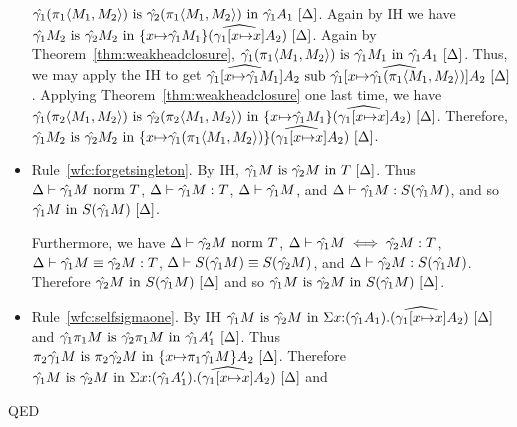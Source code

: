 \documentclass{article}
\theoremstyle{break}
\newcommand{\qed}{\mbox{QED}}
\newenvironment{proof}{\noindent{\bf Proof:}\hspace*{0.5em}}{\hspace*{\fill}\qed}
\begin{document}
\begin{proof}
\begin{itemize}
${\hat{\gamma_1}({\pi_{1}}{\langle{M_1},{M_2}\rangle})}\mathrm{\ is\ }{\hat{\gamma_2}({\pi_{1}}{\langle{M_1},{M_2}\rangle})}\mathrm{\ in\ }{\hat{\gamma_1}A_1}\ [\Delta]$.
Again by IH we have
${\hat{\gamma_1}M_2}\mathrm{\ is\ }{\hat{\gamma_2}M_2}\mathrm{\ in\ }{\{x{\mapsto}\hat{\gamma_1}M_1\}{(\widehat{\gamma_1[x{\mapsto}x]}A_2)}}\ [\Delta]$.
Again by Theorem~\ref{thm:weakheadclosure},
${\hat{\gamma_1}({\pi_{1}}{\langle{M_1},{M_2}\rangle})}\mathrm{\ is\ }{\hat{\gamma_1}M_1}\mathrm{\ in\ }{\hat{\gamma_1}A_1}\ [\Delta]$.
Thus, we may apply the IH to get
${\widehat{\hat{\gamma_1}[x{\mapsto}\hat{\gamma_1}M_1]}A_2}\mathrm{\ sub\ }{\widehat{\hat{\gamma_1}[x{\mapsto}\hat{\gamma_1}({\pi_{1}}{\langle{M_1},{M_2}\rangle})]}A_2}\ [\Delta]$.
Applying Theorem~\ref{thm:weakheadclosure} one last time, we have
${\hat{\gamma_1}({\pi_{2}}{\langle{M_1},{M_2}\rangle})}\mathrm{\ is\ }{\hat{\gamma_2}({\pi_{2}}{\langle{M_1},{M_2}\rangle})}\mathrm{\ in\ }{\{x{\mapsto}\hat{\gamma_1}M_1\}{(\widehat{\gamma_1[x{\mapsto}x]}A_2)}}\ [\Delta]$.
Therefore,
${\hat{\gamma_1}M_2}\mathrm{\ is\ }{\hat{\gamma_2}M_2}\mathrm{\ in\ }{\{x{\mapsto}\hat{\gamma_1}({\pi_{1}}{\langle{M_1},{M_2}\rangle})\}{(\widehat{\gamma_1[x{\mapsto}x]}A_2)}}\ [\Delta]$.

\item Rule~\ref{wfc:forgetsingleton}.
By IH, ${\hat{\gamma_1}M}\mathrm{\ is\ }{\hat{\gamma_2}M}\mathrm{\ in\ }{T}\ [\Delta]$.
Thus ${\Delta}\vdash{\hat{\gamma_1}M}\mbox{\ norm\ }{T}$, 
$\Delta\vdash \hat{\gamma_1}M : T$, 
$\Delta\vdash \hat{\gamma_1}M$, and
$\Delta\vdash \hat{\gamma_1}M : S(\hat{\gamma_1}M)$,
and so
${\hat{\gamma_1}M}\mathrm{\ in\ }{S(\hat{\gamma_1}M)}\ [\Delta]$.

Furthermore, we have ${\Delta}\vdash{\hat{\gamma_2}M}\mbox{\ norm\ }{T}$,
$\Delta\vdash \hat{\gamma_1}M \iff \hat{\gamma_2}M : T$,
$\Delta\vdash \hat{\gamma_1}M \equiv \hat{\gamma_2}M : T$,
$\Delta\vdash S(\hat{\gamma_1}M) \equiv S(\hat{\gamma_2}M)$, and
$\Delta\vdash \hat{\gamma_2}M : S(\hat{\gamma_1}M)$.
Therefore ${\hat{\gamma_2}M}\mathrm{\ in\ }{S(\hat{\gamma_1}M)}\ [\Delta]$ and
so ${\hat{\gamma_1}M}\mathrm{\ is\ }{\hat{\gamma_2}M}\mathrm{\ in\ }{S(\hat{\gamma_1}M)}\ [\Delta]$.

\item Rule~\ref{wfc:selfsigmaone}.
By IH
${\hat{\gamma_1}M}\mathrm{\ is\ }{\hat{\gamma_2}M}\mathrm{\ in\ }{\Sigma x{:}(\hat{\gamma_1}A_1).(\widehat{\gamma_1[x{\mapsto}x]}{A_2})}\ [\Delta]$ and
${\hat{\gamma_1}{{\pi_{1}}{M}}}\mathrm{\ is\ }{\hat{\gamma_2}{{\pi_{1}}{M}}}\mathrm{\ in\ }{\hat{\gamma_1}A'_1}\ [\Delta]$.
Thus 
${{\pi_{2}}{\hat{\gamma_1}M}}\mathrm{\ is\ }{{\pi_{2}}{\hat{\gamma_2}M}}\mathrm{\ in\ }{\{x{\mapsto}{\pi_{1}}{\hat{\gamma_1}M}\}{A_2}}\ [\Delta]$.
Therefore
${\hat{\gamma_1}M}\mathrm{\ is\ }{\hat{\gamma_2}M}\mathrm{\ in\ }{\Sigma x{:}(\hat{\gamma_1}A'_1).(\widehat{\gamma_1[x{\mapsto}x]}{A_2})}\ [\Delta]$ and


\end{itemize}
\end{proof}
\end{document}
